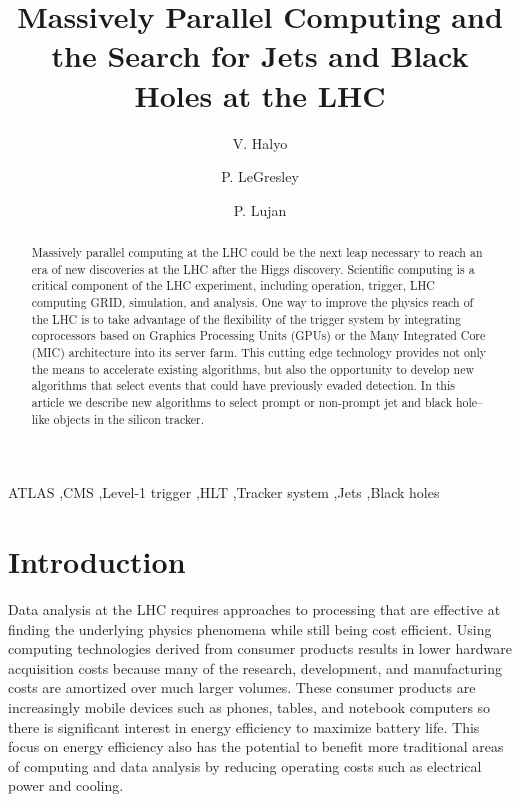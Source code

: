 \documentclass[preprint,sort&compress]{elsarticle}
\begin{document}
\begin{frontmatter}

\title{Massively Parallel Computing and the Search for Jets and Black Holes at the LHC}

\author{V. Halyo}
\author{P. LeGresley}
\author{P. Lujan}
\address{Department of Physics, Princeton University, Princeton, NJ 08544, USA}


\begin{abstract}
Massively parallel computing at the LHC could be the next leap necessary to reach an era of new discoveries at
the LHC after the Higgs discovery. Scientific computing is a critical component of the LHC experiment, including
operation, trigger, LHC computing GRID, simulation, and analysis. One way to improve the physics reach of the LHC is to
take advantage of the flexibility of the trigger system by integrating coprocessors based on Graphics Processing Units (GPUs) or the Many Integrated Core (MIC) architecture into its server farm. This cutting edge technology provides not only the means to accelerate
existing algorithms, but also the opportunity to develop new algorithms that select events that could have previously
evaded detection. In this article we describe new algorithms to select prompt or non-prompt jet and black hole--like
objects in the silicon tracker.
\end{abstract}

\begin{keyword}
ATLAS \sep CMS \sep Level-1 trigger \sep HLT \sep Tracker system \sep Jets \sep Black holes
\end{keyword}

\end{frontmatter}

\section{Introduction} 

Data analysis at the LHC requires approaches to processing that are effective at finding the underlying physics phenomena while still being cost efficient.  Using computing technologies derived from consumer products results in lower hardware acquisition costs because many of the research, development, and manufacturing costs are amortized over much larger volumes.  These consumer products are increasingly mobile devices such as phones, tables, and notebook computers so there is significant interest in energy efficiency to maximize battery life.  This focus on energy efficiency also has the potential to benefit more traditional areas of computing and data analysis by reducing operating costs such as electrical power and cooling.
\end{document}
